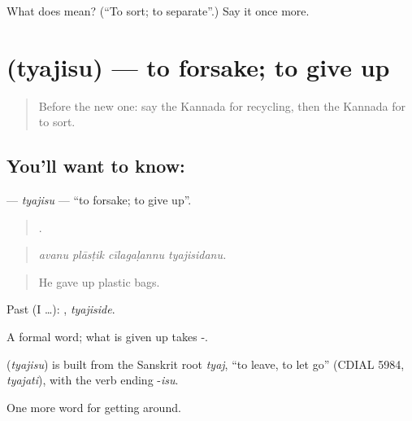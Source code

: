 \begin{tcolorbox}[breakable,colback=teal!4,colframe=teal!35!black,title={Before you move on}]
What does  mean? (\textquotedblleft{}To sort; to separate\textquotedblright{}.) Say it once more.
\end{tcolorbox}
\section[\texorpdfstring{\kn{ತ್ಯಜಿಸು} (tyajisu)}{ತ್ಯಜಿಸು (tyajisu)}]{ (tyajisu) — to forsake; to give up}

\label{lesson:KA-C474-tyajisu}



\begin{quote}
Before the new one: say the Kannada for recycling, then the Kannada for to sort.
\end{quote}

\subsection*{You'll want to know: }
\textbf{} — \emph{tyajisu} — \textquotedblleft{}to forsake; to give up\textquotedblright{}.

\begin{quote}
   .
\end{quote}

\begin{quote}
\emph{avanu plāsṭik cīlagaḷannu tyajisidanu.}
\end{quote}

\begin{quote}
He gave up plastic bags.
\end{quote}

Past (I …): , \emph{tyajiside}.

A formal word; what is given up takes -.

\begin{cousinweb}
\textbf{} (\emph{tyajisu}) is built from the Sanskrit root \emph{tyaj}, \textquotedblleft{}to leave, to let go\textquotedblright{} (CDIAL 5984, \emph{tyajati}), with the verb ending -\emph{isu}.
\end{cousinweb}

\begin{grammarlens}[title={What you've built}]
One more word for getting around.
\end{grammarlens}

